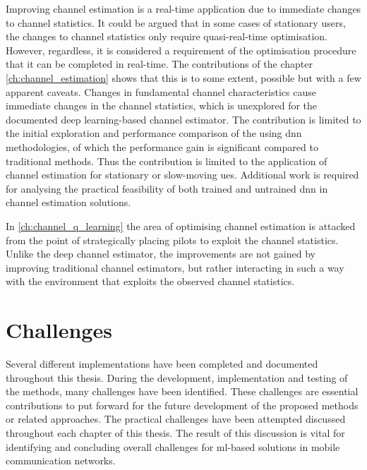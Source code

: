 Improving channel estimation is a real-time application due to immediate changes to channel statistics. It could be argued that in some cases of stationary users, the changes to channel statistics only require quasi-real-time optimisation. However, regardless, it is considered a requirement of the optimisation procedure that it can be completed in real-time. The contributions of the chapter \ref{ch:channel_estimation} shows that this is to some extent, possible but with a few apparent caveats. Changes in fundamental channel characteristics cause immediate changes in the channel statistics, which is unexplored for the documented deep learning-based channel estimator. The contribution is limited to the initial exploration and performance comparison of the using \gls{dnn} methodologies, of which the performance gain is significant compared to traditional methods. Thus the contribution is limited to the application of channel estimation for stationary or slow-moving \glspl{ue}. Additional work is required for analysing the practical feasibility of both trained and untrained \gls{dnn} in channel estimation solutions.

In \ref{ch:channel_q_learning} the area of optimising channel estimation is attacked from the point of strategically placing pilots to exploit the channel statistics. Unlike the deep channel estimator, the improvements are not gained by improving traditional channel estimators, but rather interacting in such a way with the environment that exploits the observed channel statistics. 


\section{Challenges}
Several different implementations have been completed and documented throughout this thesis. During the development, implementation and testing of the methods, many challenges have been identified. These challenges are essential contributions to put forward for the future development of the proposed methods or related approaches. The practical challenges have been attempted discussed throughout each chapter of this thesis. The result of this discussion is vital for identifying and concluding overall challenges for \gls{ml}-based solutions in mobile communication networks.


